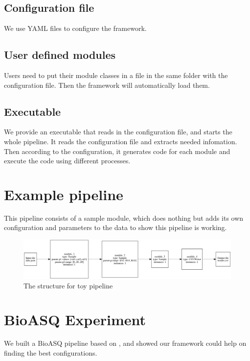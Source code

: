 \documentclass{article}
\begin{document}
    \subsection{Configuration file}
    We use YAML files to configure the framework.

    \subsection{User defined modules}
    Users need to put their module classes in a file in the same folder with the configuration file.
    Then the framework will automatically load them.

    \subsection{Executable}
    We provide an executable that reads in the configuration file, and starts the whole pipeline.
    It reads the configuration file and extracts needed infomation.
    Then according to the configuration, it generates code for each module and execute the code using different processes.


\section{Example pipeline}
    This pipeline consists of a sample module,
    which does nothing but adds its own configuration and parameters to the data to show this pipeline is working.

    \begin{figure}[H]
        \begin{center}
            \includegraphics[width=1.2\textwidth]{fig/toy_pipeline.png}
        \end{center}
        \label{fig:toy_pipeline}
        \caption{The structure for toy pipeline}
    \end{figure}



\section{BioASQ Experiment}

    We built a BioASQ pipeline based on \cite{yang2016learning},
    and showed our framework could help on finding the best configurations.
\end{document}
